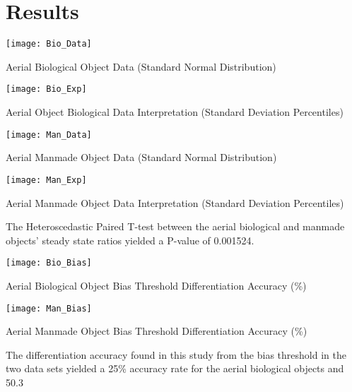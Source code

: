 \section{Results}

\begin{table}[H]
	\center 
	\texttt{[image: Bio\_Data]}
	\caption[Aerial Biological Object Data]{Aerial Biological Object Data (Standard Normal Distribution)}
\end{table}

\begin{table}[H]
	\center 
	\texttt{[image: Bio\_Exp]}
	\caption[Aerial Biological Object Standard Normal Distribution Interpretation]{Aerial Object Biological Data Interpretation (Standard Deviation Percentiles)}
\end{table}

\newpage

\begin{table}[H]
	\center 
	\texttt{[image: Man\_Data]}
	\caption[Aerial Manmade Object Data]{Aerial Manmade Object Data (Standard Normal Distribution)}
\end{table}

\begin{table}[H]
	\center 
	\texttt{[image: Man\_Exp]}
	\caption[Aerial Manmade Object Standard Normal Distribution Interpretation]{Aerial Manmade Object Data Interpretation (Standard Deviation Percentiles)}
\end{table}

\indent The Heteroscedastic Paired T-test between the aerial biological and manmade objects' steady state ratios yielded a P-value of 0.001524.

\newpage

\begin{table}[H]
	\center 
	\texttt{[image: Bio\_Bias]}
	\caption[Aerial Biological Object Bias Threshold Differentiation Accuracy]{Aerial Biological Object Bias Threshold Differentiation Accuracy (\%)}
\end{table}

\begin{table}[H]
	\center 
	\texttt{[image: Man\_Bias]}
	\caption[Aerial Manmade Object Bias Threshold Differentiation Accuracy]{Aerial Manmade Object Bias Threshold Differentiation Accuracy (\%)}
\end{table}

\indent The differentiation accuracy found in this study from the bias threshold in the two data sets yielded a 25\% accuracy rate for the aerial biological objects and 50.3%

\newpage